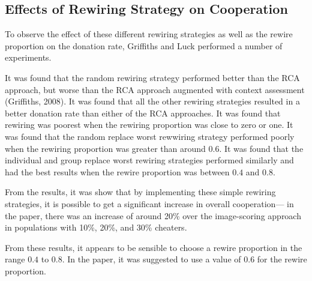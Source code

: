 \subsection{Effects of Rewiring Strategy on Cooperation}

To observe the effect of these different rewiring strategies as well as the
rewire proportion on the donation rate, Griffiths and Luck performed a number
of experiments.

It was found that the random rewiring strategy performed better than the RCA
approach, but worse than the RCA approach augmented with context assessment
(Griffiths, 2008). It was found that all the other rewiring strategies resulted
in a better donation rate than either of the RCA approaches. It was found that
rewiring was poorest when the rewiring proportion was close to zero or one.
It was found that the random replace worst rewwiring strategy performed poorly
when the rewiring proportion was greater than around $0.6$. It was found that
the individual and group replace worst rewiring strategies performed similarly
and had the best results when the rewire proportion was between $0.4$ and $0.8$.

From the results, it was show that by implementing these simple rewiring
strategies, it is possible to get a significant increase in overall cooperation---
in the paper, there was an increase of around 20\% over the image-scoring approach
in populations with 10\%, 20\%, and 30\% cheaters.

From these results, it appears to be sensible to choose a rewire proportion in
the range $0.4$ to $0.8$. In the paper, it was suggested to use a value of $0.6$
for the rewire proportion.
